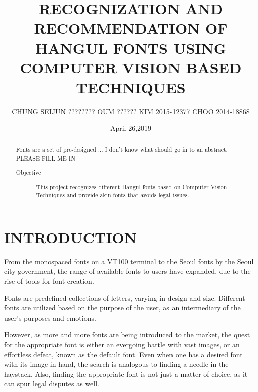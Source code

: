 \documentclass[%
 reprint,
nofootinbib,
nobibnotes,
amsmath,amssymb,
aps,
]{revtex4-1}
\begin{document}

\title{RECOGNIZATION AND RECOMMENDATION OF HANGUL FONTS USING COMPUTER VISION BASED
TECHNIQUES}%

\author{CHUNG SEIJUN ???????? OUM ?????? KIM  2015-12377 CHOO 2014-18868   }
%
\date{April 26,2019}

\begin{abstract}
  Fonts are a set of pre-designed ... I don't know what should go in to an
  abstract. PLEASE FILL ME IN
\begin{description}
\item[Objective]
This project recognizes different Hangul fonts based on Computer Vision
    Techniques and provide akin fonts that avoids legal issues.
\end{description}
\end{abstract}

\maketitle


\section{\label{sec:level1}INTRODUCTION}
From the monospaced fonts on a VT100 terminal to the
Seoul fonts by the Seoul city government, the range of available fonts to users have expanded, due to the rise of tools for font creation.

Fonts are predefined collections of letters, varying in design and size.
Different fonts are utilized based on the purpose of the user, as an
intermediary of the user's purposes and emotions.

However, as more and more fonts are being introduced to the market, the quest
for the appropriate font is either an evergoing battle with vast images,
or an effortless defeat, known as the default font. Even when one has a
desired font with its image in hand, the search is analogous to finding a needle in the
haystack. Also, finding the appropriate font is not just a matter of choice, as it can spur legal
disputes as well.\cite{lawsuit}
\end{document}
